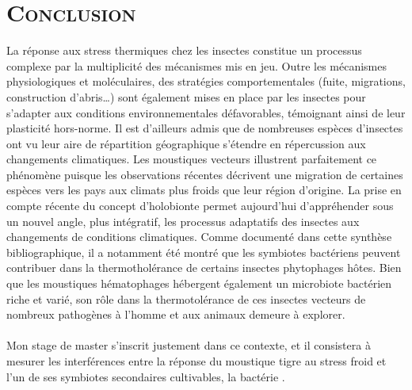 
\section*{\textsc{Conclusion}}

La réponse aux stress thermiques chez les insectes constitue un processus complexe par la multiplicité des mécanismes mis en jeu.
Outre les mécanismes physiologiques et moléculaires, des stratégies comportementales (fuite, migrations, construction d'abris\ldots) sont également mises en place par les insectes pour s'adapter aux conditions environnementales défavorables, témoignant ainsi de leur plasticité hors-norme. 
Il est d'ailleurs admis que de nombreuses espèces d'insectes ont vu leur aire de répartition géographique s'étendre en répercussion aux changements climatiques.
Les moustiques vecteurs illustrent parfaitement ce phénomène puisque les observations récentes décrivent une migration de certaines espèces vers les pays aux climats plus froids que leur région d'origine.
La prise en compte récente du concept d'holobionte permet aujourd'hui d'appréhender sous un nouvel angle, plus intégratif, les processus adaptatifs des insectes aux changements de conditions climatiques.
Comme documenté dans cette synthèse bibliographique, il a notamment été montré que les symbiotes bactériens peuvent contribuer dans la thermotholérance de certains insectes phytophages hôtes.
Bien que les moustiques hématophages hébergent également un microbiote bactérien riche et varié, son rôle dans la thermotolérance de ces insectes vecteurs de nombreux pathogènes à l'homme et aux animaux demeure à explorer.

\paragraph*{}
Mon stage de master s'inscrit justement dans ce contexte, et il consistera à mesurer les interférences entre la réponse du moustique tigre  au stress froid et l'un de ses symbiotes secondaires cultivables, la bactérie . 

